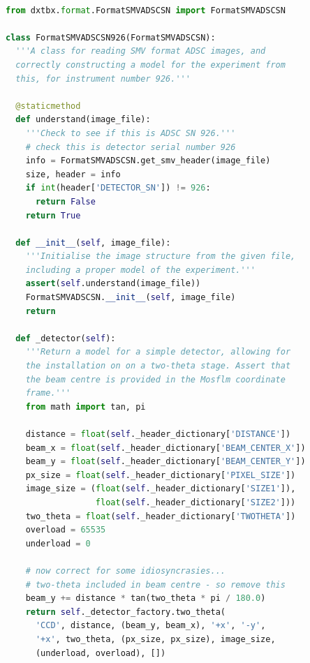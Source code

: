 \documentclass[preprint]{iucr}
\begin{document}
\begin{lstlisting}[language=Python]

from dxtbx.format.FormatSMVADSCSN import FormatSMVADSCSN

class FormatSMVADSCSN926(FormatSMVADSCSN):
  '''A class for reading SMV format ADSC images, and 
  correctly constructing a model for the experiment from 
  this, for instrument number 926.'''

  @staticmethod
  def understand(image_file):
    '''Check to see if this is ADSC SN 926.'''
    # check this is detector serial number 926
    info = FormatSMVADSCSN.get_smv_header(image_file)
    size, header = info
    if int(header['DETECTOR_SN']) != 926:
      return False
    return True

  def __init__(self, image_file):
    '''Initialise the image structure from the given file, 
    including a proper model of the experiment.'''
    assert(self.understand(image_file))
    FormatSMVADSCSN.__init__(self, image_file)
    return

  def _detector(self):
    '''Return a model for a simple detector, allowing for 
    the installation on on a two-theta stage. Assert that 
    the beam centre is provided in the Mosflm coordinate 
    frame.'''
    from math import tan, pi

    distance = float(self._header_dictionary['DISTANCE'])
    beam_x = float(self._header_dictionary['BEAM_CENTER_X'])
    beam_y = float(self._header_dictionary['BEAM_CENTER_Y'])
    px_size = float(self._header_dictionary['PIXEL_SIZE'])
    image_size = (float(self._header_dictionary['SIZE1']),
                  float(self._header_dictionary['SIZE2']))
    two_theta = float(self._header_dictionary['TWOTHETA'])
    overload = 65535
    underload = 0

    # now correct for some idiosyncrasies...
    # two-theta included in beam centre - so remove this
    beam_y += distance * tan(two_theta * pi / 180.0)
    return self._detector_factory.two_theta(
      'CCD', distance, (beam_y, beam_x), '+x', '-y',
      '+x', two_theta, (px_size, px_size), image_size,
      (underload, overload), [])

\end{lstlisting}


\end{document}
